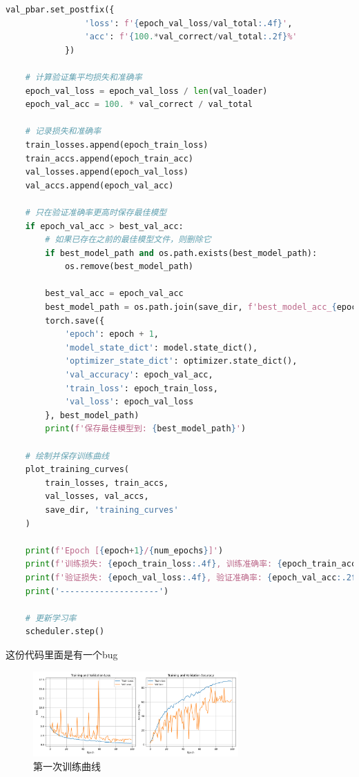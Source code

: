 \documentclass[12pt,a4paper,UTF8]{article}
\begin{document}
\begin{lstlisting}[language=Python, caption=训练代码]
            val_pbar.set_postfix({
                'loss': f'{epoch_val_loss/val_total:.4f}',
                'acc': f'{100.*val_correct/val_total:.2f}%'
            })
    
    # 计算验证集平均损失和准确率
    epoch_val_loss = epoch_val_loss / len(val_loader)
    epoch_val_acc = 100. * val_correct / val_total
    
    # 记录损失和准确率
    train_losses.append(epoch_train_loss)
    train_accs.append(epoch_train_acc)
    val_losses.append(epoch_val_loss)
    val_accs.append(epoch_val_acc)
    
    # 只在验证准确率更高时保存最佳模型
    if epoch_val_acc > best_val_acc:
        # 如果已存在之前的最佳模型文件，则删除它
        if best_model_path and os.path.exists(best_model_path):
            os.remove(best_model_path)
        
        best_val_acc = epoch_val_acc
        best_model_path = os.path.join(save_dir, f'best_model_acc_{epoch_val_acc:.2f}.pth')
        torch.save({
            'epoch': epoch + 1,
            'model_state_dict': model.state_dict(),
            'optimizer_state_dict': optimizer.state_dict(),
            'val_accuracy': epoch_val_acc,
            'train_loss': epoch_train_loss,
            'val_loss': epoch_val_loss
        }, best_model_path)
        print(f'保存最佳模型到: {best_model_path}')
    
    # 绘制并保存训练曲线
    plot_training_curves(
        train_losses, train_accs, 
        val_losses, val_accs,
        save_dir, 'training_curves'
    )
    
    print(f'Epoch [{epoch+1}/{num_epochs}]')
    print(f'训练损失: {epoch_train_loss:.4f}, 训练准确率: {epoch_train_acc:.2f}%')
    print(f'验证损失: {epoch_val_loss:.4f}, 验证准确率: {epoch_val_acc:.2f}%')
    print('--------------------')
    
    # 更新学习率
    scheduler.step()
\end{lstlisting}

这份代码里面是有一个bug
\begin{figure}[htbp] \centering \includegraphics[width=0.7\textwidth]{figures/2024-12-12-19-27-16.png} \caption{第一次训练曲线} \end{figure}
\end{document}
